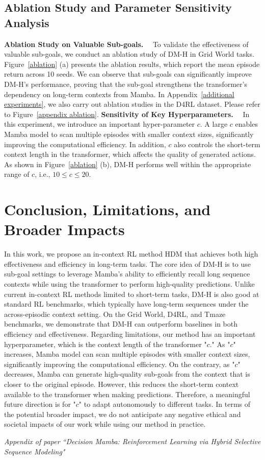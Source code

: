 \documentclass{article}
\begin{document}
\subsection{Ablation Study and Parameter Sensitivity Analysis}
\label{Ablation}
\noindent\textbf{Ablation Study on Valuable Sub-goals.}~~
To validate the effectiveness of valuable sub-goals, we conduct an ablation study of DM-H in Grid World tasks.
Figure~\ref{ablation} (a) presents the ablation results, which report the mean episode return across 10 seeds.
We can observe that sub-goals can significantly improve DM-H's performance, proving that the sub-goal strengthens the transformer's dependency on long-term contexts from Mamba. In Appendix~\ref{additional experiments}, we also carry out ablation studies in the D4RL dataset. Please refer to Figure~\ref{appendix ablation}.
\noindent\textbf{Sensitivity of Key Hyperparameters.}~~
In this experiment, we introduce an important hyper-parameter $c$. A large $c$ enables Mamba model to scan multiple episodes with smaller context sizes, significantly improving the computational efficiency. In addition, $c$ also controls the short-term context length in the transformer, which affects the quality of generated actions. As shown in Figure~\ref{ablation} (b), DM-H performs well within the appropriate range of $c$, i.e., $10\leq c \leq 20$.
\section{Conclusion, Limitations, and Broader Impacts}
\label{limitation}
In this work, we propose an in-context RL method HDM that achieves both high effectiveness and efficiency in long-term tasks. The core idea of DM-H is to use sub-goal settings to leverage Mamba's ability to efficiently recall long sequence contexts while using the transformer to perform high-quality predictions. Unlike current in-context RL methods limited to short-term tasks, DM-H is also good at standard RL benchmarks, which typically have long-term sequences under the across-episodic context setting. On the Grid World, D4RL, and Tmaze benchmarks, we demonstrate that DM-H can outperform baselines in both efficiency and effectiveness.
Regarding limitations, our method has an important hyperparameter, which is the context length of the transformer "$c$." As "$c$" increases, Mamba model can scan multiple episodes with smaller context sizes, significantly improving the computational efficiency. On the contrary, as "$c$" decreases, Mamba can generate high-quality sub-goals from the context that is closer to the original episode. However, this reduces the short-term context available to the transformer when making predictions. Therefore, a meaningful future direction is for "$c$" to adapt autonomously to different tasks. In terms of the potential broader impact, we do not anticipate any negative ethical and societal impacts of our work while using our method in practice.


\newpage
\appendix
\onecolumn
\large
\begin{center}
   \emph{Appendix of paper ``Decision Mamba: Reinforcement Learning via Hybrid Selective Sequence Modeling"}
\end{center}
\normalsize
\end{document}
